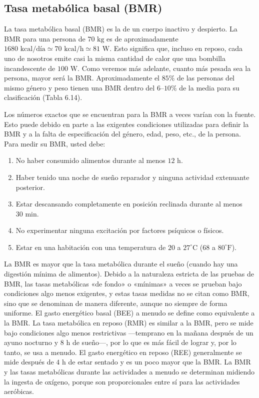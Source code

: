 \documentclass[12pt]{book}
\begin{document}
\subsection{Tasa metabólica basal (BMR)}

La tasa metabólica basal (BMR) es la de un cuerpo inactivo y despierto. La BMR para una persona de $70\text{ kg}$ es de aproximadamente $1680\text{ kcal/día} \simeq 70\text{ kcal/h} \simeq 81\text{ W}$. Esto significa que, incluso en reposo, cada uno de nosotros emite casi la misma cantidad de calor que una bombilla incandescente de $100\text{ W}$. Como veremos más adelante, cuanto más pesada sea la persona, mayor será la BMR. Aproximadamente el $85\%$ de las personas del mismo género y peso tienen una BMR dentro del $6\text{--}10\%$ de la media para su clasificación (Tabla 6.14).

Los números exactos que se encuentran para la BMR a veces varían con la fuente. Esto puede debido en parte a las exigentes condiciones utilizadas para definir la BMR y a la falta de especificación del género, edad, peso, etc., de la persona. Para medir su BMR, usted debe:
\begin{enumerate}[label={(\arabic*)}]
  \item No haber consumido alimentos durante al menos $12\text{ h}$.
  \item Haber tenido una noche de sueño reparador y ninguna actividad extenuante posterior.
  \item Estar descansando completamente en posición reclinada durante al menos $30\text{ min}$.
  \item No experimentar ninguna excitación por factores psíquicos o físicos.
  \item Estar en una habitación con una temperatura de $20$ a $27^\circ\text{C}$ ($68$ a $80^\circ\text{F}$).
\end{enumerate}

La BMR es mayor que la tasa metabólica durante el sueño (cuando hay una digestión mínima de alimentos). Debido a la naturaleza estricta de las pruebas de BMR, las tasas metabólicas «de fondo» o «mínimas» a veces se prueban bajo condiciones algo menos exigentes, y estas tasas medidas no se citan como BMR, sino que se denominan de manera diferente, aunque no siempre de forma uniforme. El gasto energético basal (BEE) a menudo se define como equivalente a la BMR. La tasa metabólica en reposo (RMR) es similar a la BMR, pero se mide bajo condiciones algo menos restrictivas ---temprano en la mañana después de un ayuno nocturno y $8\text{ h}$ de sueño---, por lo que es más fácil de lograr y, por lo tanto, se usa a menudo. El gasto energético en reposo (REE) generalmente se mide después de $4\text{ h}$ de estar sentado y es un poco mayor que la BMR. La BMR y las tasas metabólicas durante las actividades a menudo se determinan midiendo la ingesta de oxígeno, porque son proporcionales entre sí para las actividades aeróbicas.
\end{document}

